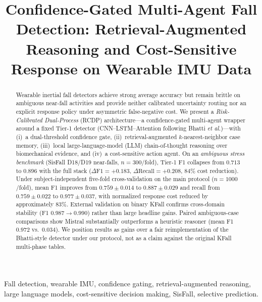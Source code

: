 \documentclass[journal]{IEEEtran}
\begin{document}
\title{Confidence-Gated Multi-Agent Fall Detection: Retrieval-Augmented Reasoning and Cost-Sensitive Response on Wearable IMU Data}

\author{%
}

\maketitle

\begin{abstract}
Wearable inertial fall detectors achieve strong average accuracy but remain brittle on ambiguous near-fall activities and provide neither calibrated uncertainty routing nor an explicit response policy under asymmetric false-negative cost. We present a \emph{Risk-Calibrated Dual-Process} (RCDP) architecture---a confidence-gated multi-agent wrapper around a fixed Tier-1 detector (CNN--LSTM--Attention following Bhatti \textit{et al.})---with (i)~a dual-threshold confidence gate, (ii)~retrieval-augmented $k$-nearest-neighbor case memory, (iii)~local large-language-model (LLM) chain-of-thought reasoning over biomechanical evidence, and (iv)~a cost-sensitive action agent. On an \emph{ambiguous stress benchmark} (SisFall D18/D19 near-falls, $n{=}300$/fold), Tier-1 F1 collapses from $0.713$ to $0.896$ with the full stack ($\Delta\text{F1}{=}+0.183$, $\Delta\text{Recall}{=}+0.208$, $84\%$ cost reduction). Under subject-independent five-fold cross-validation on the main protocol ($n{=}1000$/fold), mean F1 improves from $0.759{\pm}0.014$ to $0.887{\pm}0.029$ and recall from $0.759{\pm}0.022$ to $0.977{\pm}0.037$, with normalized response cost reduced by approximately $83\%$. External validation on binary KFall confirms cross-domain stability (F1 $0.987{\rightarrow}0.990$) rather than large headline gains. Paired ambiguous-case comparisons show Mistral substantially outperforms a heuristic reasoner (mean F1 $0.972$ vs.\ $0.034$). We position results as gains over a fair reimplementation of the Bhatti-style detector under our protocol, not as a claim against the original KFall multi-phase tables.
\end{abstract}

\begin{IEEEkeywords}
Fall detection, wearable IMU, confidence gating, retrieval-augmented reasoning, large language models, cost-sensitive decision making, SisFall, selective prediction.
\end{IEEEkeywords}
\end{document}
